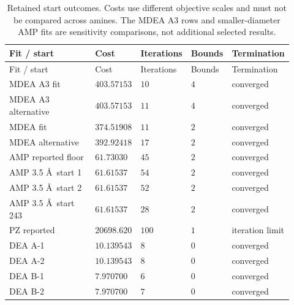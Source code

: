 \begin{longtable}{@{}>{\raggedright\arraybackslash}p{0.39\linewidth}>{\raggedright\arraybackslash}p{0.16\linewidth}>{\raggedright\arraybackslash}p{0.12\linewidth}>{\raggedright\arraybackslash}p{0.09\linewidth}>{\raggedright\arraybackslash}p{0.16\linewidth}@{}}
\caption{Retained start outcomes. Costs use different objective scales and must not be compared across amines. The MDEA A3 rows and smaller-diameter AMP fits are sensitivity comparisons, not additional selected results.}\label{tab:p2-fit-starts}\\
\toprule Fit / start & Cost & Iterations & Bounds & Termination \\ \midrule\endfirsthead
\toprule Fit / start & Cost & Iterations & Bounds & Termination \\ \midrule\endhead
\bottomrule\endfoot
MDEA A3 fit & $403.57153$ & $10$ & $4$ & converged \\
MDEA A3 alternative & $403.57153$ & $11$ & $4$ & converged \\
MDEA fit & $374.51908$ & $11$ & $2$ & converged \\
MDEA alternative & $392.92418$ & $17$ & $2$ & converged \\
AMP reported floor & $61.73030$ & $45$ & $2$ & converged \\
AMP 3.5 \AA\ start 1 & $61.61537$ & $54$ & $2$ & converged \\
AMP 3.5 \AA\ start 2 & $61.61537$ & $52$ & $2$ & converged \\
AMP 3.5 \AA\ start 243 & $61.61537$ & $28$ & $2$ & converged \\
PZ reported & $20698.620$ & $100$ & $1$ & iteration limit \\
DEA A-1 & $10.139543$ & $8$ & $0$ & converged \\
DEA A-2 & $10.139543$ & $8$ & $0$ & converged \\
DEA B-1 & $7.970700$ & $6$ & $0$ & converged \\
DEA B-2 & $7.970700$ & $7$ & $0$ & converged \\
\end{longtable}\endgroup
